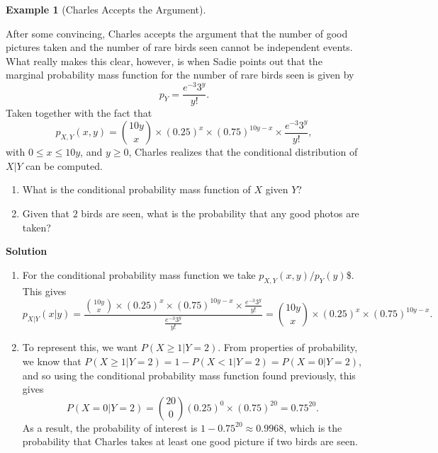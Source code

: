\documentclass[
  letterpaper,
  DIV=11,
  numbers=noendperiod]{scrreprt}
\providecommand{\tightlist}{%
  \setlength{\itemsep}{0pt}\setlength{\parskip}{0pt}}\usepackage{longtable,booktabs,array}
\theoremstyle{definition}
\theoremstyle{definition}
\theoremstyle{definition}
\newtheorem{example}{Example}[chapter]
\theoremstyle{remark}
\begin{document}
\begin{example}[Charles Accepts the
Argument]\protect\hypertarget{exm-conditional-pmf}{}\label{exm-conditional-pmf}

After some convincing, Charles accepts the argument that the number of
good pictures taken and the number of rare birds seen cannot be
independent events. What really makes this clear, however, is when Sadie
points out that the marginal probability mass function for the number of
rare birds seen is given by \[p_{Y} = \frac{e^{-3}3^y}{y!}.\] Taken
together with the fact that
\[p_{X,Y}(x, y) = \binom{10y}{x}\times(0.25)^{x}\times(0.75)^{10y - x}\times\frac{e^{-3}3^y}{y!},\]
with \(0 \leq x \leq 10y\), and \(y \geq 0\), Charles realizes that the
conditional distribution of \(X|Y\) can be computed.

\begin{enumerate}
\def\labelenumi{\alph{enumi}.}
\tightlist
\item
  What is the conditional probability mass function of \(X\) given
  \(Y\)?
\item
  Given that \(2\) birds are seen, what is the probability that any good
  photos are taken?
\end{enumerate}

\begin{tcolorbox}[enhanced jigsaw, colback=white, breakable, rightrule=.15mm, leftrule=.75mm, toprule=.15mm, left=2mm, arc=.35mm, opacityback=0, bottomrule=.15mm]

\vspace{-3mm}\textbf{Solution}\vspace{3mm}

\begin{enumerate}
\def\labelenumi{\alph{enumi}.}
\item
  For the conditional probability mass function we take
  \(p_{X,Y}(x, y)/p_{Y}(y)\)\$. This gives
  \[p_{X|Y}(x|y) = \frac{\binom{10y}{x}\times(0.25)^{x}\times(0.75)^{10y - x}\times\frac{e^{-3}3^y}{y!}}{\frac{e^{-3}3^y}{y!}} = \binom{10y}{x}\times(0.25)^{x}\times(0.75)^{10y - x}.\]
\item
  To represent this, we want \(P(X \geq 1 | Y = 2)\). From properties of
  probability, we know that
  \(P(X \geq 1 | Y = 2) = 1 - P(X < 1 | Y = 2) = P(X = 0 | Y = 2)\), and
  so using the conditional probability mass function found previously,
  this gives
  \[P(X = 0 | Y = 2) = \binom{20}{0}(0.25)^{0}\times(0.75)^{20} = 0.75^{20}.\]
  As a result, the probability of interest is
  \(1-0.75^{20} \approx 0.9968\), which is the probability that Charles
  takes at least one good picture if two birds are seen.
\end{enumerate}

\end{tcolorbox}

\end{example}
\end{document}
